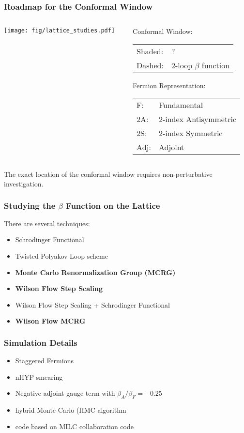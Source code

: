 \begin{frame}
  \frametitle{Roadmap for the Conformal Window}
  \begin{columns}[T]
    \begin{column}{.6\textwidth}
      \texttt{[image: fig/lattice\_studies.pdf]}
    \end{column}
    \begin{column}{.4\textwidth}
      \small
      Conformal Window:
      \begin{tabular}{l l}
        Shaded: & ?\\
        Dashed: & 2-loop $\beta$ function
      \end{tabular}
      \vspace{24pt}
      \newline
      Fermion Representation:
      \begin{tabular}{l l}
        F: & Fundamental\\
        2A: & 2-index Antisymmetric\\
        2S: & 2-index Symmetric\\
        Adj: & Adjoint
      \end{tabular}
    \end{column}
  \end{columns}
  \vspace{12pt}
  The exact location of the conformal window requires non-perturbative investigation.
\end{frame}

\begin{frame}
  \frametitle{Studying the $\beta$ Function on the Lattice}
  \begin{center}
    There are several techniques:
  \end{center}
  \begin{itemize}
    \item Schrodinger Functional
    \item Twisted Polyakov Loop scheme
    \item \textbf{Monte Carlo Renormalization Group (MCRG)}
    \item \textbf{Wilson Flow Step Scaling}
    \item Wilson Flow Step Scaling + Schrodinger Functional
    \item \textbf{Wilson Flow MCRG}
  \end{itemize}
\end{frame}

\begin{frame}
  \frametitle{Simulation Details}
  \begin{itemize}
    \item Staggered Fermions
    \item nHYP smearing
    \item Negative adjoint gauge term with $\beta_A/\beta_F=-0.25$
    \item hybrid Monte Carlo (HMC algorithm
    \item code based on MILC collaboration code
  \end{itemize}
\end{frame}

